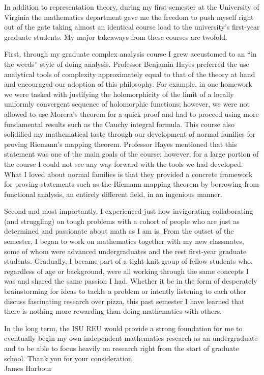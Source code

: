 \documentclass[11pt]{article}
\begin{document}
In addition to representation theory, during my first semester at the University of Virginia the mathematics department gave me the freedom to push myself right out of the gate taking almost an identical course load to the university's first-year graduate students. My major takeaways from these courses are twofold.

First, through my graduate complex analysis course I grew accustomed to an ``in the weeds'' style of doing analysis. Professor Benjamin Hayes preferred the use analytical tools of complexity approximately equal to that of the theory at hand and encouraged our adoption of this philosophy. For example, in one homework we were tasked with justifying the holomorphicity of the limit of a locally uniformly convergent sequence of holomorphic functions; however, we were not allowed to use Morera's theorem for a quick proof and had to proceed using more fundamental results such as the Cauchy integral formula. This course also solidified my mathematical taste through our development of normal families for proving Riemann's mapping theorem. Professor Hayes mentioned that this statement was one of the main goals of the course; however, for a large portion of the course I could not see any way forward with the tools we had developed. What I loved about normal families is that they provided a concrete framework for proving statements such as the Riemann mapping theorem by borrowing from functional analysis, an entirely different field, in an ingenious manner.


Second and most importantly, I experienced just how invigorating collaborating (and struggling) on tough problems with a cohort of people who are just as determined and passionate about math as I am is. From the outset of the semester, I began to work on mathematics together with my new classmates, some of whom were advanced undergraduates and the rest first-year graduate students. Gradually, I became part of a tight-knit group of fellow students who, regardless of age or background, were all working through the same concepts I was and shared the same passion I had. Whether it be in the form of desperately brainstorming for ideas to tackle a problem or intently listening to each other discuss fascinating research over pizza, this past semester I have learned that there is nothing more rewarding than doing mathematics with others.


In the long term, the ISU REU would provide a strong foundation for me to eventually begin my own independent mathematics research as an undergraduate and to be able to focus heavily on research right from the start of graduate school. Thank you for your consideration. \\

\noindent James Harbour
\end{document}
